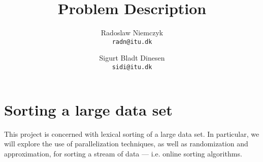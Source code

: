 \documentclass[a4paper, titlepage]{report}
\renewcommand{\%}{\scalebox{.9}{\oldpct}}
\begin{document}
\title{Problem Description}
\author{
	Radoslaw Niemczyk
	\\\texttt{radn@itu.dk}
	\and
	Sigurt Bladt Dinesen
	\\\texttt{sidi@itu.dk}
}

\maketitle


\section*{Sorting a large data set}
This project is concerned with lexical sorting of a large data set.
In particular, we will explore the use of parallelization techniques, as well as
randomization and approximation, for sorting a stream of data --- i.e. online sorting algorithms.
\end{document}
